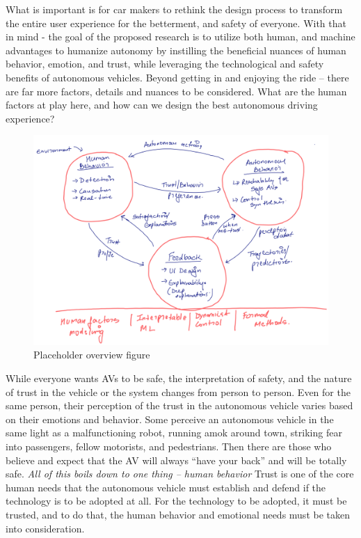 What is important is for car makers to rethink the design process to transform the entire user experience for the betterment, and safety of everyone. 
With that in mind - the goal of the proposed research is to utilize both human, and machine advantages to humanize autonomy by instilling the beneficial nuances of human behavior, emotion, and trust, while leveraging the technological and safety benefits of autonomous vehicles.
Beyond getting in and enjoying the ride – there are far more factors, details and nuances to be considered. 
What are the human factors at play here, and how can we design the best autonomous driving experience?

\begin{figure}
    \centering
    \includegraphics[width=0.6\columnwidth]{figures/overview.png}
    \caption{Placeholder overview figure}
    \label{fig:overview}
\end{figure}



While everyone wants AVs to be safe, the interpretation of safety, and the nature of trust in the vehicle or the system changes from person to person.
Even for the same person, their perception of the trust in the autonomous vehicle varies based on their emotions and behavior.
Some perceive an autonomous vehicle in the same light as a malfunctioning robot, running amok around town, striking fear into passengers, fellow motorists, and pedestrians.
Then there are those who believe and expect that the AV will always ``have your back'' and will be totally safe.
\textit{All of this boils down to one thing – human behavior}
Trust is one of the core human needs that the autonomous vehicle must establish and defend if the technology is to be adopted at all.
For the technology to be adopted, it must be trusted, and to do that, the human behavior and emotional needs must be taken into consideration. 


